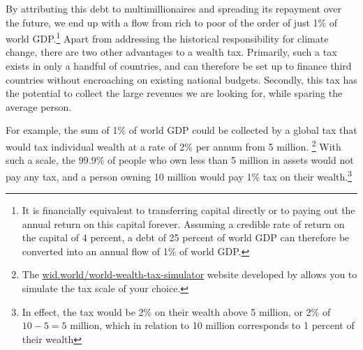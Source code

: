 \documentclass[a5paper,english,openany]{memoir}
\begin{document}
By attributing this debt to multimillionaires and spreading its repayment over the future, we end up with a flow from rich to poor of the order of just %
1\% of world GDP.\footnote{It is financially equivalent to transferring %
capital directly or to paying %
out the annual return on this capital forever. Assuming a credible rate of return on the %
capital of %
4 percent, %
a debt of 25 percent %
of world GDP can therefore be converted into an annual flow of 1\% of world GDP.} 
Apart from addressing the historical responsibility for climate change, there are two other advantages to a wealth tax. Primarily, %
such a tax exists in only a handful of countries, and can therefore be set up to finance third countries without encroaching on existing national budgets. Secondly, this tax has the potential to collect the large revenues we are looking for, while sparing the average person. %

For example, the sum of 1\% of world GDP could be collected by a global tax that would tax individual wealth at a rate of 2\% per annum %
from 5 million.%
\footnote{
The \href{https://wid.world/world-wealth-tax-simulator/}{wid.world/world-wealth-tax-simulator} website developed by \cite{chancel_world_2022} allows you to simulate the tax scale of your choice.} %
With such a scale, the 99.9\% of people who own less than 5 million in assets would not pay any tax, and a person owning 10 million would pay 1\% tax on their %
wealth.\footnote{In effect, the tax would be 2\% on their %
wealth above 5 million, or 2\% of $10-5=5$ million, which in relation to 10 million corresponds to 1 percent of their wealth  %
} 
\end{document}
